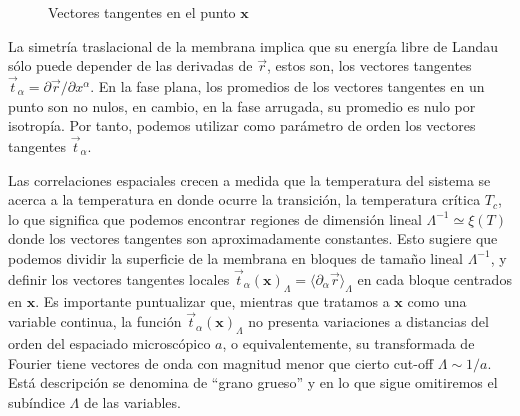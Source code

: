 \begin{figure}[h]
\centering
 
\caption{Vectores tangentes en el punto $\mathbf{x}$}
\end{figure}

La simetría traslacional de la membrana implica que su energía libre de Landau
sólo puede depender de las derivadas de $\vec{r}$, estos son, los vectores
tangentes $\vec{t}_{\alpha}=\partial \vec{r}/\partial x^{\alpha} $. En la fase
plana, los promedios de los vectores tangentes en un punto son no nulos, en
cambio, en la fase arrugada, su promedio es nulo por isotropía. Por tanto,
podemos utilizar como  parámetro de orden los vectores tangentes
$\vec{t}_{\alpha}$.

Las correlaciones espaciales crecen a medida que la temperatura del sistema se
acerca a la temperatura en donde ocurre la transición, la temperatura
crítica $T_c$, lo que significa que podemos encontrar regiones de dimensión
lineal $\Lambda^{-1}\simeq \xi(T) $ donde los vectores tangentes son
aproximadamente constantes. Esto sugiere que podemos dividir la superficie de
la membrana en bloques de tamaño lineal $\Lambda^{-1}$, y definir los vectores
tangentes locales
$\vec{t}_{\alpha}(\mathbf{x})_{\Lambda}=\langle \partial_{\alpha}\vec{r}\rangle_{\Lambda}$
en cada bloque centrados en $\mathbf{x}$. Es importante puntualizar que,
mientras que tratamos a $\mathbf{x}$ como una variable continua, la función
$\vec{t}_{\alpha}(\mathbf{x})_{\Lambda}$ no presenta variaciones a distancias
del orden del espaciado microscópico $a$, o equivalentemente, su transformada
de Fourier tiene vectores de onda con magnitud menor que cierto cut-off
$\Lambda \sim 1/a$. Está descripción se denomina de ``grano grueso'' y en lo
que sigue omitiremos el subíndice $\Lambda$ de las variables.

